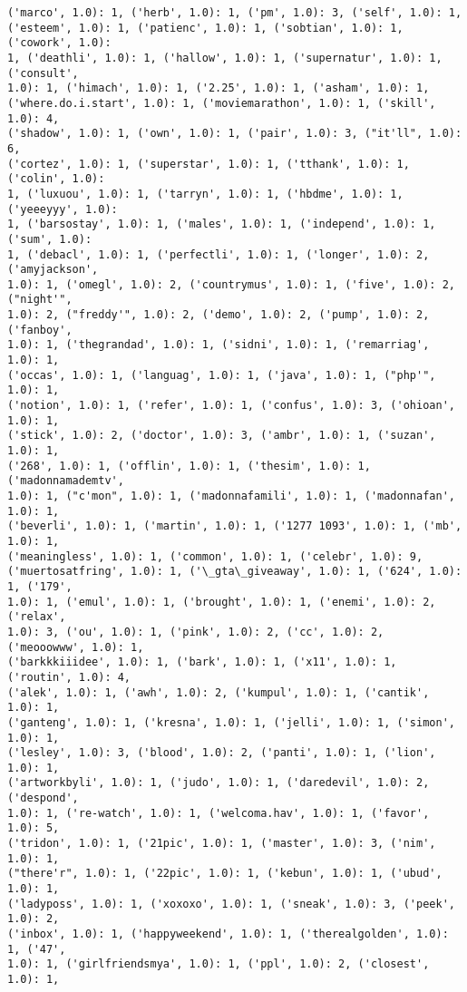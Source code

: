 \documentclass[11pt]{article}
\begin{document}
\begin{Verbatim}[commandchars=\\\{\}]
('marco', 1.0): 1, ('herb', 1.0): 1, ('pm', 1.0): 3, ('self', 1.0): 1,
('esteem', 1.0): 1, ('patienc', 1.0): 1, ('sobtian', 1.0): 1, ('cowork', 1.0):
1, ('deathli', 1.0): 1, ('hallow', 1.0): 1, ('supernatur', 1.0): 1, ('consult',
1.0): 1, ('himach', 1.0): 1, ('2.25', 1.0): 1, ('asham', 1.0): 1,
('where.do.i.start', 1.0): 1, ('moviemarathon', 1.0): 1, ('skill', 1.0): 4,
('shadow', 1.0): 1, ('own', 1.0): 1, ('pair', 1.0): 3, ("it'll", 1.0): 6,
('cortez', 1.0): 1, ('superstar', 1.0): 1, ('tthank', 1.0): 1, ('colin', 1.0):
1, ('luxuou', 1.0): 1, ('tarryn', 1.0): 1, ('hbdme', 1.0): 1, ('yeeeyyy', 1.0):
1, ('barsostay', 1.0): 1, ('males', 1.0): 1, ('independ', 1.0): 1, ('sum', 1.0):
1, ('debacl', 1.0): 1, ('perfectli', 1.0): 1, ('longer', 1.0): 2, ('amyjackson',
1.0): 1, ('omegl', 1.0): 2, ('countrymus', 1.0): 1, ('five', 1.0): 2, ("night'",
1.0): 2, ("freddy'", 1.0): 2, ('demo', 1.0): 2, ('pump', 1.0): 2, ('fanboy',
1.0): 1, ('thegrandad', 1.0): 1, ('sidni', 1.0): 1, ('remarriag', 1.0): 1,
('occas', 1.0): 1, ('languag', 1.0): 1, ('java', 1.0): 1, ("php'", 1.0): 1,
('notion', 1.0): 1, ('refer', 1.0): 1, ('confus', 1.0): 3, ('ohioan', 1.0): 1,
('stick', 1.0): 2, ('doctor', 1.0): 3, ('ambr', 1.0): 1, ('suzan', 1.0): 1,
('268', 1.0): 1, ('offlin', 1.0): 1, ('thesim', 1.0): 1, ('madonnamademtv',
1.0): 1, ("c'mon", 1.0): 1, ('madonnafamili', 1.0): 1, ('madonnafan', 1.0): 1,
('beverli', 1.0): 1, ('martin', 1.0): 1, ('1277 1093', 1.0): 1, ('mb', 1.0): 1,
('meaningless', 1.0): 1, ('common', 1.0): 1, ('celebr', 1.0): 9,
('muertosatfring', 1.0): 1, ('\_gta\_giveaway', 1.0): 1, ('624', 1.0): 1, ('179',
1.0): 1, ('emul', 1.0): 1, ('brought', 1.0): 1, ('enemi', 1.0): 2, ('relax',
1.0): 3, ('ou', 1.0): 1, ('pink', 1.0): 2, ('cc', 1.0): 2, ('meooowww', 1.0): 1,
('barkkkiiidee', 1.0): 1, ('bark', 1.0): 1, ('x11', 1.0): 1, ('routin', 1.0): 4,
('alek', 1.0): 1, ('awh', 1.0): 2, ('kumpul', 1.0): 1, ('cantik', 1.0): 1,
('ganteng', 1.0): 1, ('kresna', 1.0): 1, ('jelli', 1.0): 1, ('simon', 1.0): 1,
('lesley', 1.0): 3, ('blood', 1.0): 2, ('panti', 1.0): 1, ('lion', 1.0): 1,
('artworkbyli', 1.0): 1, ('judo', 1.0): 1, ('daredevil', 1.0): 2, ('despond',
1.0): 1, ('re-watch', 1.0): 1, ('welcoma.hav', 1.0): 1, ('favor', 1.0): 5,
('tridon', 1.0): 1, ('21pic', 1.0): 1, ('master', 1.0): 3, ('nim', 1.0): 1,
("there'r", 1.0): 1, ('22pic', 1.0): 1, ('kebun', 1.0): 1, ('ubud', 1.0): 1,
('ladyposs', 1.0): 1, ('xoxoxo', 1.0): 1, ('sneak', 1.0): 3, ('peek', 1.0): 2,
('inbox', 1.0): 1, ('happyweekend', 1.0): 1, ('therealgolden', 1.0): 1, ('47',
1.0): 1, ('girlfriendsmya', 1.0): 1, ('ppl', 1.0): 2, ('closest', 1.0): 1,

\end{Verbatim}
\end{document}
